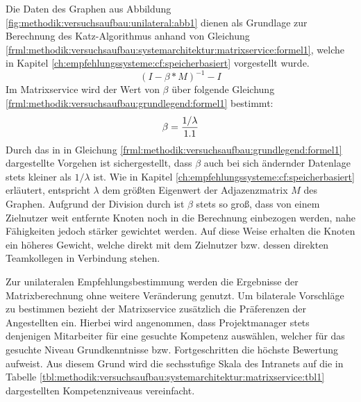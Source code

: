 Die Daten des Graphen aus Abbildung \ref{fig:methodik:versuchsaufbau:unilateral:abb1} dienen als Grundlage zur Berechnung des Katz-Algorithmus anhand von Gleichung \ref{frml:methodik:versuchsaufbau:systemarchitektur:matrixservice:formel1}, welche in Kapitel \ref{ch:empfehlungssysteme:cf:speicherbasiert} vorgestellt wurde.
\begin{equation}
	(I - \beta * M)^{-1} - I
	\label{frml:methodik:versuchsaufbau:systemarchitektur:matrixservice:formel1}
\end{equation}
Im Matrixservice wird der Wert von $\beta$ über folgende Gleichung \ref{frml:methodik:versuchsaufbau:grundlegend:formel1} bestimmt:
\begin{equation}
	\beta = \frac{1/\lambda}{1.1}
	\label{frml:methodik:versuchsaufbau:grundlegend:formel1}
\end{equation}
Durch das in in Gleichung \ref{frml:methodik:versuchsaufbau:grundlegend:formel1} dargestellte Vorgehen ist sichergestellt, dass $\beta$ auch bei sich ändernder Datenlage stets kleiner als $1/\lambda$ ist. Wie in Kapitel \ref{ch:empfehlungssysteme:cf:speicherbasiert} erläutert, entspricht $\lambda$ dem größten Eigenwert der Adjazenzmatrix $M$ des Graphen. Aufgrund der Division durch \nenner ist $\beta$ stets so groß, dass von einem Zielnutzer weit entfernte Knoten noch in die Berechnung einbezogen werden, nahe Fähigkeiten jedoch stärker gewichtet werden. Auf diese Weise erhalten die Knoten ein höheres Gewicht, welche direkt mit dem Zielnutzer bzw. dessen direkten Teamkollegen in Verbindung stehen.

Zur unilateralen Empfehlungsbestimmung werden die Ergebnisse der Matrixberechnung ohne weitere Veränderung genutzt. Um bilaterale Vorschläge zu bestimmen bezieht der Matrixservice zusätzlich die Präferenzen der Angestellten ein. Hierbei wird angenommen, dass Projektmanager stets denjenigen Mitarbeiter für eine gesuchte Kompetenz auswählen, welcher für das gesuchte Niveau  Grundkenntnisse bzw. Fortgeschritten die höchste Bewertung aufweist. Aus diesem Grund wird die sechsstufige Skala des Intranets auf die in Tabelle \ref{tbl:methodik:versuchsaufbau:systemarchitektur:matrixservice:tbl1} dargestellten Kompetenzniveaus vereinfacht. 

